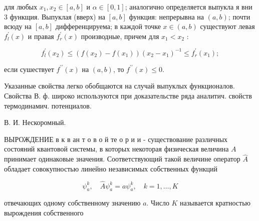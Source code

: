 \documentclass[10pt]{article}
\begin{document}
для любых $x_{1}, x_{2} \in[a, b]$ и $\alpha \in[0,1]$; аналогично определяется выпукла я вни 3 функщия. Выпуклая (вверх) на $[a, b]$ функция: непрерывна на $(a, b)$; почти всюду на $[a, b]$ дифференцируема; в каждой точке $x \in(a, b)$ существуют левая $f_{l}^{\prime}(x)$ и правая $f_{r}^{\prime}(x)$ производные, причем для $x_{1}<x_{2}$ :



\[

f_{l}^{\prime}\left(x_{2}\right) \leqslant\left(f\left(x_{2}\right)-f\left(x_{1}\right)\right)\left(x_{2}-x_{1}\right)^{-1} \leqslant f_{r}^{\prime}\left(x_{1}\right) ;

\]



если сушествует $f^{\prime \prime}(x)$ на $(a, b)$, то $f^{\prime \prime}(x) \leqslant 0$.



Указанные свойства легко обобщаются на случай выпуклых функционалов. Свойства В. ф. широко используются при доказательстве ряда аналитич. свойств термодинамич. потенциалов.



В. И. Нескоромный.



ВЫРОЖДЕНИЕ в к в ан т о в о й те о р и и - существование различных состояний квантовой системы, в которых некоторая физическая величина $A$ принимает одинаковые значения. Соответствующий такой величине оператор $\hat{A}$ обладает совокупностью линейно независимых собственных функций



\[

\psi_{a}^{k}, \quad \hat{A} \psi_{a}^{k}=a \psi_{a}^{k}, \quad k=1, \ldots, K

\]



отвечающих одному собственному значению $a$. Число $K$ называется кратностью вырождения собственного
\end{document}
